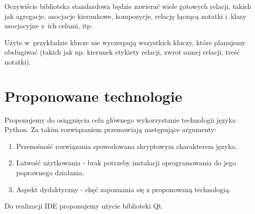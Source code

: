 \documentclass[a4paper, 11pt]{report}
\begin{document}
Oczywiście biblioteka standardowa będzie zawierać wiele gotowych relacji, takich jak agregacje,
asocjacje kierunkowe, kompozycje, relację łączącą notatki i~klasy asocjacyjne z~ich celami, itp.

Użyte w~przykładzie klucze nie wyczerpują wszystkich kluczy, które planujemy obsługiwać (takich jak
np. kierunek etykiety relacji, zwrot samej relacji, treść notatki).


\section{Proponowane technologie}
Proponujemy do osiągnięcia celu głównego wykorzystanie technologii języka Python. Za takim
rozwiązaniem przemawiają następujące argumenty:
\begin{enumerate}
  \item{Przenośność rozwiązania spowodowana skryptowym charakterem języka.}
  \item{Łatwość użytkowania - brak potrzeby instalacji oprogramowania do jego poprawnego działania.}
  \item{Aspekt dydaktyczny - chęć zapoznania się z proponowaną technologią.}
\end{enumerate}
Do realizacji IDE proponujemy użycie biblioteki Qt.
\end{document}

